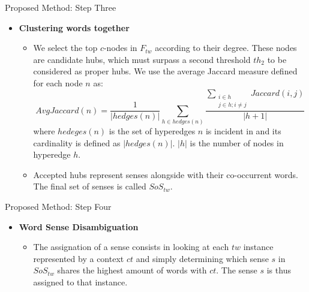 \documentclass[10pt,xcolor=table]{beamer}
\begin{document}
\begin{frame}{Proposed Method: Step Three}
\begin{itemize}
	\item \textbf{Clustering words together}
	\begin{itemize}
		\item We select the top $c$-nodes in $F_{tw}$ according to their degree. These nodes are candidate hubs, which must surpass a second threshold $th_2$ to be considered as proper hubs. We use the average Jaccard measure defined for each node $n$ as: $$AvgJaccard(n)=\frac{1}{|hedges(n)|}\sum_{h\in hedges(n)}\frac{\sum_{\substack{i\in h\\j\in h;i\neq j}}Jaccard(i,j)}{|h + 1|}$$ 
		where $hedeges(n)$ is the set of hyperedges $n$ is incident in and its cardinality is defined as $|hedges(n)|$. $|h|$ is the number of nodes in hyperedge $h$. 
		\item Accepted hubs represent senses alongside with their co-occurrent words. The final set of senses is called $SoS_{tw}$.
		
		
		
	\end{itemize}

\end{itemize}
\end{frame}


\begin{frame}{Proposed Method: Step Four}

\begin{itemize}
	\item\textbf{ Word Sense Disambiguation}
	\begin{itemize}
		\item The assignation of a sense consists in looking at each $tw$ instance represented by a context $ct$ and simply determining which sense $s$ in $SoS_{tw}$ shares the highest amount of words with $ct$. The sense $s$ is thus assigned to that instance. 
	\end{itemize}

\end{itemize}
\end{frame}
\end{document}
